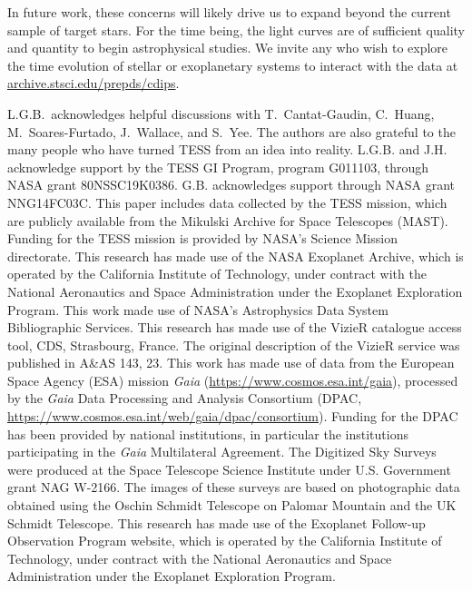 \documentclass[12pt,twocolumn,tighten]{aastex62}
\newcommand{\stscilink}{\url{archive.stsci.edu/prepds/cdips}}
\begin{document}
In future work, these concerns will likely drive us to expand beyond
the current sample of target stars.  For the time being, the light
curves are of sufficient quality and quantity to begin astrophysical
studies.  We invite any who wish to explore the time evolution of
stellar or exoplanetary systems to interact with the data at
\stscilink.



\acknowledgements
L.G.B.\ acknowledges helpful discussions with 
T.~Cantat-Gaudin,
C.~Huang,
M.~Soares-Furtado,
J.~Wallace, and
S.~Yee.  The authors are also
grateful to the many people who have turned TESS from an idea into
reality.
%
L.G.B. and J.H. acknowledge support by the TESS GI Program, program
G011103, through NASA grant 80NSSC19K0386.
%
G.B. acknowledges support through NASA grant NNG14FC03C.
%
This paper includes data collected by the TESS mission, which are
publicly available from the Mikulski Archive for Space Telescopes
(MAST).
%
Funding for the TESS mission is provided by NASA's Science Mission
directorate.
%
This research has made use of the NASA Exoplanet Archive, which is
operated by the California Institute of Technology, under contract
with the National Aeronautics and Space Administration under the
Exoplanet Exploration Program.
%
This work made use of NASA's Astrophysics Data System Bibliographic
Services.
%
This research has made use of the VizieR catalogue access tool, CDS,
Strasbourg, France. The original description of the VizieR service was
published in A\&AS 143, 23.
%
This work has made use of data from the European Space Agency (ESA)
mission {\it Gaia} (\url{https://www.cosmos.esa.int/gaia}), processed
by the {\it Gaia} Data Processing and Analysis Consortium (DPAC,
\url{https://www.cosmos.esa.int/web/gaia/dpac/consortium}). Funding
for the DPAC has been provided by national institutions, in particular
the institutions participating in the {\it Gaia} Multilateral
Agreement.
%
The Digitized Sky Surveys were produced at the Space Telescope Science
Institute under U.S. Government grant NAG W-2166. The images of these
surveys are based on photographic data obtained using the Oschin
Schmidt Telescope on Palomar Mountain and the UK Schmidt Telescope.
%
This research has made use of the Exoplanet Follow-up Observation
Program website, which is operated by the California Institute of
Technology, under contract with the National Aeronautics and Space
Administration under the Exoplanet Exploration Program.
%
\newline
%
\end{document}
